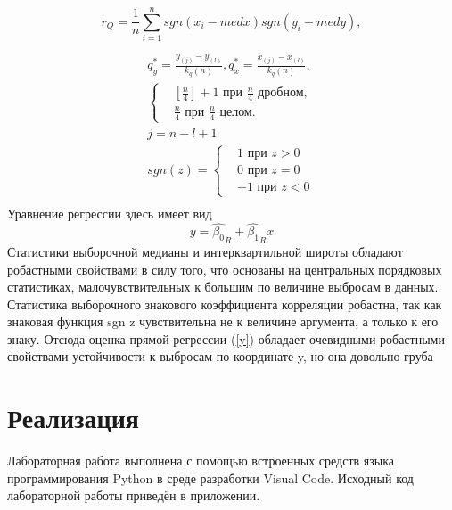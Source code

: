 \documentclass[12pt,a4paper]{scrartcl}
\begin{document}
    \begin{equation}
        r_{Q} = \frac{1}{n}\sum_{i=1}^{n}{sgn(x_{i} - med x)sgn(y_{i} - med y)},
        \label{r_Q}
    \end{equation}
    \begin{multline}
        \\\\
        q^{*}_{y} = \frac{y_{(j)} -y_{(l)}}{k_{q}(n)}, 
        q^{*}_{x} = \frac{x_{(j)} - x_{(l)}}{k_{q}(n)}, \\ 
        \begin{cases}
             & [\frac{n}{4}] + 1 \text{ при } \frac{n}{4} \text{ дробном, } \\ 
             & \frac{n}{4} \text{ при } \frac{n}{4} \text{ целом. }
        \end{cases}\\
        j = n - l + 1\\
        sgn(z) = \begin{cases}
                    & 1 \text{ при } z > 0 \\ 
                    & 0 \text{ при } z = 0 \\
                    & -1 \text{ при } z < 0
                 \end{cases}\\
        \label{q*}        
    \end{multline}
    Уравнение регрессии здесь имеет вид 
    \begin{equation}
        y = \hat{\beta_{0}}_{R} +  \hat{\beta_{1}}_{R}x
        \label{y}
    \end{equation}
    Статистики выборочной медианы и интерквартильной широты обладают робастными свойствами в силу того, что основаны на центральных порядковых статистиках, малочувствительных к большим по величине выбросам в данных. Статистика выборочного знакового коэффициента корреляции робастна, так как знаковая функция sgn z чувствительна не к величине аргумента, а только к его знаку. Отсюда оценка прямой регрессии (\ref{y}) обладает очевидными робастными свойствами устойчивости к выбросам по координате y, но она довольно груба 

\section {Реализация}
Лабораторная работа выполнена с помощью встроенных средств языка программирования Python в среде разработки Visual Code. Исходный код лабораторной работы приведён в приложении.
 
\end{document}
